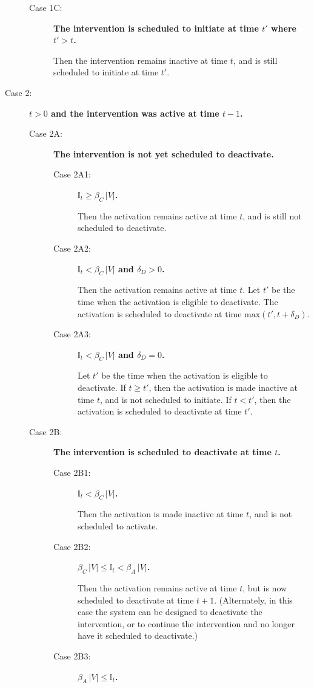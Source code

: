 \documentclass[11pt]{article}
\newcommand{\istate}{\mbox{$\mathbb{I}$}}
\begin{document}
\begin{description}
\begin{description}
\item
[Case 1C:]
{\bf The intervention is scheduled to initiate at time $t'$ where $t' > t$.}

Then the intervention remains inactive at time $t$, 
and is still scheduled to initiate at time $t'$.
\end{description}

\item
[Case 2:]
{\bf $t > 0$ and the intervention was active at time $t\!-\!1$.}
\begin{description}
\item
[Case 2A:]
{\bf The intervention is not yet scheduled to deactivate.}
\begin{description}
\item
[Case 2A1:] 
{\bf $\istate_t \geq \beta_C \, |V|$.}

Then the activation remains active at time $t$, and is still not scheduled to  deactivate.
\item
[Case 2A2:] 
{\bf $\istate_t < \beta_C \, |V|$ and $\delta_D > 0$.}

Then the activation remains active at time $t$.
Let $t'$ be the time when the activation is eligible to deactivate.
The activation is scheduled to deactivate at time $\mbox{max}(t', t+\delta_D)$.
\item
[Case 2A3:] 
{\bf $\istate_t < \beta_C \, |V|$ and $\delta_D = 0$.}

Let $t'$ be the time when the activation is eligible to deactivate.
If $t \geq t'$, then the activation is made inactive at time $t$, and is  not scheduled to initiate.
If $t < t'$, then the activation is scheduled to deactivate at time $t'$.
\end{description}

\item
[Case 2B:]
{\bf The intervention is scheduled to deactivate at time $t$.}
\begin{description}
\item
[Case 2B1:] 
{\bf $\istate_t < \beta_C \, |V|$.}

Then the activation is made inactive at time $t$, and is not scheduled to activate.
\item
[Case 2B2:] 
{\bf $\beta_C \, |V| \leq \istate_t < \beta_A \, |V|$.}

Then the activation remains active at time $t$,
but is now scheduled to deactivate at time $t+1$.
(Alternately, in this case the system can be designed to deactivate the intervention,
or to continue the intervention and no longer have it scheduled to deactivate.)
\item
[Case 2B3:] 
{\bf $\beta_A \, |V| \leq \istate_t$.}


\end{description}
\end{description}
\end{description}
\end{document}
